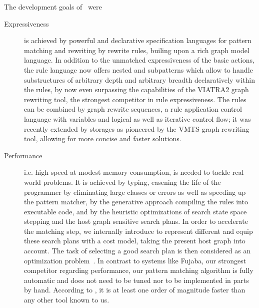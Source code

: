 The development goals of \GrG\ were

\begin{description}

\item[Expressiveness]
is achieved by powerful and declarative specification languages for pattern matching and rewriting by rewrite rules, builing upon a rich graph model language.
In addition to the unmatched expressiveness of the basic actions,
the rule language now offers nested and subpatterns which allow to handle substructures of arbitrary depth and arbitrary breadth declaratively within the rules,
by now even surpassing the capabilities of the VIATRA2\cite{viatra2,recursiveviatra} graph rewriting tool, the strongest competitor in rule expressiveness. 
The rules can be combined by graph rewrite sequences, a rule application control language with variables and logical as well as iterative control flow;
it was recently extended by storages as pioneered by the VMTS\cite{vmts} graph rewriting tool, allowing for more concise and faster solutions.

\item[Performance]
i.e. high speed at modest memory consumption, is needed to tackle real world problems.
It is achieved by typing, easening the life of the programmer by eliminating large classes or errors as well as speeding up the pattern matcher,
by the generative approach compiling the rules into executable code, 
and by the heuristic optimizations of search state space stepping and the host graph sensitive search plans.
In order to accelerate the matching step, we internally introduce  
to represent different  and equip these search plans with a cost model, taking the present host graph into account.
The task of selecting a good search plan is then considered as an optimization problem~\cite{BKG:07,Bat:06}.
In contrast to systems like Fujaba\cite{fujaba,fuj}, our strongest competitor regarding performance, 
our pattern matching algorithm is fully automatic and does not need to be tuned nor to be implemented in parts by hand.
According to \cite{varro_bench}, it is at least one order of magnitude faster than any other tool known to us.


\end{description}
